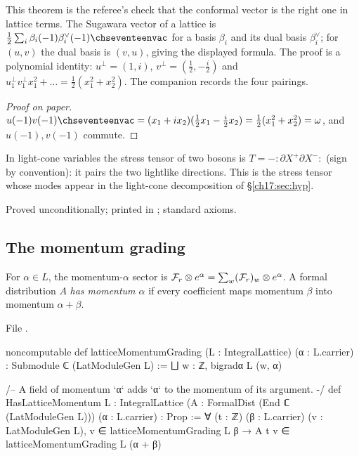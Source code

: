 \begin{dictionary}
This theorem is the referee's check that the conformal vector is the right one in lattice terms.  The
Sugawara vector of a lattice is $\frac12\sum_i\beta_i(-1)\beta_i^\vee(-1)\chseventeenvac$ for a basis $\beta_i$ and its dual
basis $\beta_i^\vee$; for $(u,v)$ the dual basis is $(v,u)$, giving the displayed formula.  The proof is a
polynomial identity: $u^\perp=(1,i)$, $v^\perp=(\frac12,-\frac i2)$ and $u^\perp_1v^\perp_1x_1^2+\dots=\frac12(x_1^2+x_2^2)$.
The companion  records the four pairings.
\end{dictionary}

\begin{proof}[Proof on paper]
$u(-1)v(-1)\chseventeenvac=(x_1+ix_2)(\tfrac12x_1-\tfrac i2x_2)=\tfrac12(x_1^2+x_2^2)=\omega$, and $u(-1),v(-1)$ commute.
\end{proof}

\begin{physics}
In light-cone variables the stress tensor of two bosons is $T=-{:}\partial X^+\partial X^-{:}$ (sign by
convention): it pairs the two lightlike directions.  This is the stress tensor whose modes appear in the
light-cone decomposition of \S\ref{ch17:sec:hyp}.
\end{physics}

\begin{status}
Proved unconditionally; printed in ; standard axioms.
\end{status}

\subsection{The momentum grading}

\begin{definition}\label{ch17:def:momentum}
For $\alpha\in L$, the momentum-$\alpha$ sector is $\mathcal{F}_r\otimes e^\alpha=\sum_w(\mathcal{F}_r)_w\otimes e^\alpha$.  A
formal distribution $A$ \emph{has momentum $\alpha$} if every coefficient maps momentum $\beta$ into momentum $\alpha+\beta$.
\end{definition}

\noindent File .
\begin{leancode}
noncomputable def latticeMomentumGrading (L : IntegralLattice) (α : L.carrier) :
    Submodule ℂ (LatModuleGen L) := ⨆ w : ℤ, bigradα L (w, α)

/-- A field of momentum `α` adds `α` to the momentum of its argument. -/
def HasLatticeMomentum {L : IntegralLattice}
    (A : FormalDist (End ℂ (LatModuleGen L))) (α : L.carrier) : Prop :=
  ∀ (t : ℤ) (β : L.carrier) (v : LatModuleGen L), v ∈ latticeMomentumGrading L β →
    A t v ∈ latticeMomentumGrading L (α + β)
\end{leancode}

